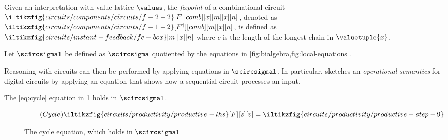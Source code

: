 \begin{definition}[Fixpoint]
    Given an interpretation with value lattice \(\values\), the \emph{fixpoint}
    of a combinational circuit \(
        \iltikzfig{circuits/components/circuits/f-2-2}[F][comb][x][m][x][n]
    \), denoted as \(
        \iltikzfig{circuits/components/circuits/f-1-2}[F^\dagger][comb][m][x][n]
    \), is defined as \(
        \iltikzfig{circuits/instant-feedback/fc-box}[m][x][n]
    \) where \(c\) is the length of the longest chain in \(\valuetuple{x}\).
\end{definition}

\begin{definition}
    Let \(\scircsigmal\) be defined as \(\scircsigma\) quotiented by the
    equations in \cref{fig:bialgebra,fig:local-equations}.
\end{definition}

Reasoning with circuits can then be performed by applying equations in
\(\scircsigmal\).
In particular, \cite{ghica2022compositional} sketches an
\emph{operational semantics} for digital circuits by applying an equation
that shows how a sequential circuit processes an input.

\begin{theorem}
    The \eqref{eq:cycle} equation in \cref{fig:cycle} holds in \(\scircsigmal\).
\end{theorem}

\begin{figure*}
    \centering
    \begin{equation*}
        \tag{\(\mathsf{Cycle}\)}
        \iltikzfig{circuits/productivity/productive-lhs}[F][s][v]
        =
        \iltikzfig{circuits/productivity/productive-step-9}
        \label{eq:cycle}
    \end{equation*}
    \caption{The cycle equation, which holds in \(\scircsigmal\)}
    \label{fig:cycle}
\end{figure*}